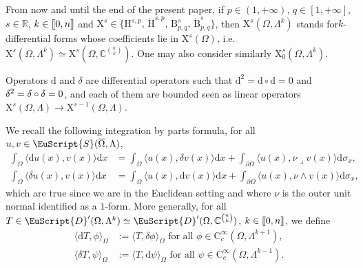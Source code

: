 \documentclass[AHL,Unicode,longabstracts,published]{cedram}
\newcommand{\bbR}{\mathbb{R}}
\newcommand{\bbC}{\mathbb{C}}
\newcommand{\rmH}{\mathrm{H}}%
\newcommand{\rmB}{\mathrm{B}}
\newcommand{\rmd}{\mathrm{d}}
\newcommand{\rmC}{\mathrm{C}}
\newcommand{\rmX}{\mathrm{X}}
\newcommand{\eus}{\EuScript}
\newcommand{\llbracket}{\mathopen{[\mkern -2.7mu[}}
\newcommand{\rrbracket}{\mathclose{]\mkern -2.7mu]}}
\newcommand{\llb}{\llbracket}
\newcommand{\rrb}{\rrbracket}
\begin{document}
From now and until the end of the present paper, if $p\in(1,+\infty)$, $q\in[1,+\infty]$, $s\in\bbR$, $k\in\llb 0,n \rrb$ and $\rmX ^s\in\{\rmH^{s,p},\, \dot{\rmH}^{s,p},\, \rmB^{s}_{p,q},\, \dot{\rmB}^{s}_{p,q}\}$, then $\rmX^s(\Omega,\Lambda^k)$ stands for\linebreak $k$-differential forms whose coefficients lie in $\rmX^s(\Omega)$, i.e. $\rmX^s(\Omega,\Lambda^k)\simeq \rmX^s(\Omega,\bbC^{\binom{n}{k}})$. One may also consider similarly $\rmX^s_0(\Omega,\Lambda^k)$.

Operators $\rmd$ and ${\delta}$ are differential operators such that $\rmd^2 = \rmd \circ \rmd = 0$ and ${\delta}^2 = {\delta} \circ {\delta}\linebreak = 0$, and each of them are bounded seen as linear operators $\rmX^s(\Omega,\Lambda)\longrightarrow \rmX^{s-1}(\Omega,\Lambda)$.

We recall the following integration by parts formula, for all $u,v\in \eus{S}({\overline{\Omega}},\Lambda)$,
\begin{align}
\int_{\Omega} \langle \rmd u(x), v(x)\rangle \rmd x &= \int_{\Omega} \langle u(x), {\delta} v(x)\rangle \rmd x + \int_{\partial\Omega} \langle u(x), \nu\lrcorner v(x)\rangle \rmd\sigma_x,\label{eq:IntbyParts1}
\\
\int_{\Omega} \langle {\delta} u(x), v(x)\rangle \rmd x &= \int_{\Omega} \langle u(x), \rmd v(x)\rangle \rmd x + \int_{\partial\Omega} \langle u(x), \nu\wedge v(x)\rangle \rmd\sigma_x,\label{eq:IntbyParts2}
\end{align}
which are true since we are in the Euclidean setting and where $\nu$ is the outer unit normal identified as a $1$-form. More generally, for all $T\in \eus{D}'(\Omega,\Lambda^k)\simeq \eus{D}'(\Omega,\bbC^{\binom{n}{k}})$, $k\in\llb 0,n\rrb$, we define
\begin{align*}
\big\langle \rmd T, \phi \big\rangle_{\Omega} &:= \big\langle T, {\delta}\phi \big\rangle_{\Omega} \text{ for all }\phi \in \rmC_c^\infty
\left(\Omega,\Lambda^{k+1}\right),
\\
\big\langle {\delta}T, \psi \big\rangle_{\Omega} &:= \big\langle T,\rmd\psi \big\rangle_{\Omega} \text{ for all }\psi \in \rmC_c^\infty
\left(\Omega,\Lambda^{k-1}\right).
\end{align*}
\end{document}
